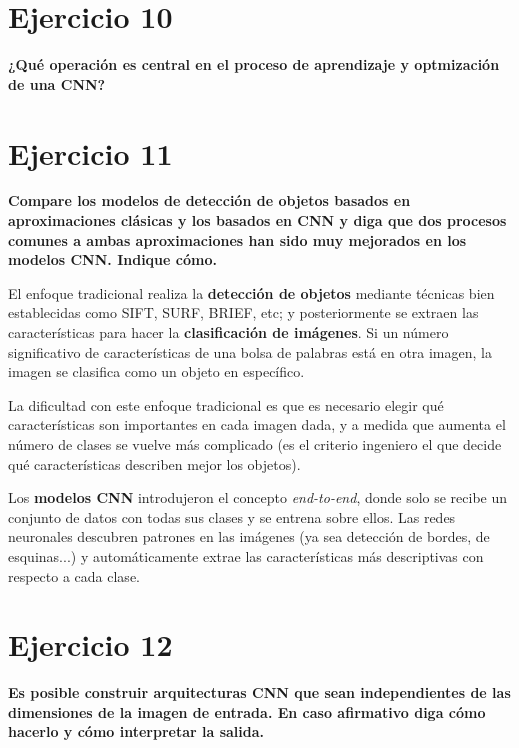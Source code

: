 \documentclass[11pt,a4paper]{article}
\begin{document}
\section*{Ejercicio 10}

\textbf{¿Qué operación es central en el proceso de aprendizaje y optmización de una CNN?}




\section*{Ejercicio 11}

\textbf{Compare los modelos de detección de objetos basados en aproximaciones clásicas y los basados en CNN y diga que dos procesos comunes a ambas aproximaciones han
sido muy mejorados en los modelos CNN. Indique cómo.}

El enfoque tradicional realiza la \textbf{detección de objetos} mediante técnicas bien establecidas como SIFT, SURF, BRIEF, etc; y posteriormente se extraen las
características para hacer la \textbf{clasificación de imágenes}. Si un número significativo de características de una bolsa de palabras está en otra imagen, la imagen
se clasifica como un objeto en específico.

La dificultad con este enfoque tradicional es que es necesario elegir qué características son importantes en cada imagen dada, y a medida que aumenta el número de clases
se vuelve más complicado (es el criterio ingeniero el que decide qué características describen mejor los objetos).

Los \textbf{modelos CNN} introdujeron el concepto \textit{end-to-end}, donde solo se recibe un conjunto de datos con todas sus clases y se entrena sobre ellos. Las redes
neuronales descubren patrones en las imágenes (ya sea detección de bordes, de esquinas...) y automáticamente extrae las características más descriptivas con respecto a
cada clase.


\section*{Ejercicio 12}

\textbf{Es posible construir arquitecturas CNN que sean independientes de las dimensiones de la imagen de entrada. En caso afirmativo diga cómo hacerlo y cómo
interpretar la salida.}
\end{document}
